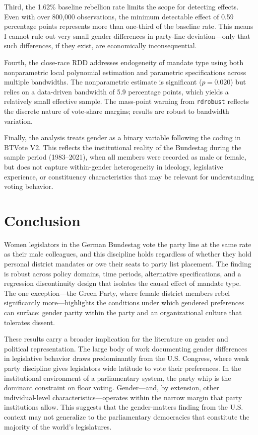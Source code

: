 \documentclass[12pt]{article}
\begin{document}
Third, the 1.62\% baseline rebellion rate limits the scope for detecting effects. Even with over 800,000 observations, the minimum detectable effect of 0.59 percentage points represents more than one-third of the baseline rate. This means I cannot rule out very small gender differences in party-line deviation---only that such differences, if they exist, are economically inconsequential.

Fourth, the close-race RDD addresses endogeneity of mandate type using both nonparametric local polynomial estimation \citep{calonico2014} and parametric specifications across multiple bandwidths. The nonparametric estimate is significant ($p = 0.020$) but relies on a data-driven bandwidth of 5.9 percentage points, which yields a relatively small effective sample. The mass-point warning from \texttt{rdrobust} reflects the discrete nature of vote-share margins; results are robust to bandwidth variation.

Finally, the analysis treats gender as a binary variable following the coding in BTVote V2. This reflects the institutional reality of the Bundestag during the sample period (1983--2021), when all members were recorded as male or female, but does not capture within-gender heterogeneity in ideology, legislative experience, or constituency characteristics that may be relevant for understanding voting behavior.


\section{Conclusion}\label{sec:conclusion}

Women legislators in the German Bundestag vote the party line at the same rate as their male colleagues, and this discipline holds regardless of whether they hold personal district mandates or owe their seats to party list placement. The finding is robust across policy domains, time periods, alternative specifications, and a regression discontinuity design that isolates the causal effect of mandate type. The one exception---the Green Party, where female district members rebel significantly more---highlights the conditions under which gendered preferences can surface: gender parity within the party and an organizational culture that tolerates dissent.

These results carry a broader implication for the literature on gender and political representation. The large body of work documenting gender differences in legislative behavior draws predominantly from the U.S. Congress, where weak party discipline gives legislators wide latitude to vote their preferences. In the institutional environment of a parliamentary system, the party whip is the dominant constraint on floor voting. Gender---and, by extension, other individual-level characteristics---operates within the narrow margin that party institutions allow. This suggests that the gender-matters finding from the U.S. context may not generalize to the parliamentary democracies that constitute the majority of the world's legislatures.
\end{document}
